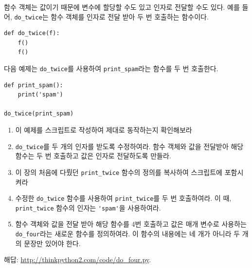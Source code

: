 \documentclass[10pt]{book}
\begin{document}
\begin{exercise}

함수 객체는 값이기 때문에 변수에 할당할 수도 있고 인자로 전달할 수도
있다.  예를 들어, \verb"do_twice"는 함수 객체를 인자로 전달 받아 두 번
호출하는 함수이다.

\begin{verbatim}
def do_twice(f):
    f()
    f()
\end{verbatim}

다음 예제는 \verb"do_twice"를 사용하여 \verb"print_spam"라는 함수를 두 번 호출한다.


\begin{verbatim}
def print_spam():
    print('spam')

do_twice(print_spam)
\end{verbatim}

\begin{enumerate}

\item 이 예제를 스크립트로 작성하여 제대로 동작하는지 확인해보라

\item \verb"do_twice"를 두 개의 인자를 받도록 수정하여라.  함수 객체와
  값을 전달받아 해당 함수는 두 번 호출하고 값은 인자로 전달하도록
  만들라.

\item 이 장의 처음에 다뤘던 \verb"print_twice" 함수의 정의를 복사하여
  스크립트에 포함시켜라

\item 수정한 \verb"do_twice" 함수를 사용하여 \verb"print_twice"를 두 번
  호출하여라.  이 때, \verb"print_twice" 함수의 인자는 \verb"'spam'"을
  사용하여라.

\item 함수 객체와 값을 전달 받아 해당 함수를 4번 호출하고 값은 매개
  변수로 사용하는 \verb"do_four"라는 새로운 함수를 정의하여라.  이
  함수의 내용에는 네 개가 아니라 두 개의 문장만 있어야 한다.

\end{enumerate}

해답: \url{http://thinkpython2.com/code/do_four.py}.

\end{exercise}
\end{document}
